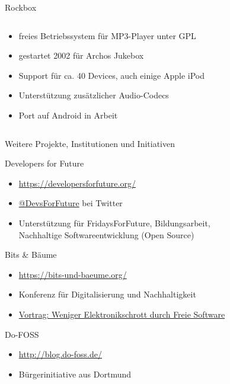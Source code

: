 \documentclass[t]{beamer}
\begin{document}
\begin{frame}{Rockbox}
    \begin{columns}[T]
        \begin{column}{0.45\textwidth}
            \begin{itemize}
                \item freies Betriebssystem für MP3-Player unter GPL
                \item gestartet 2002 für Archos Jukebox
                \item Support für ca. 40 Devices, auch einige Apple iPod
                \item Unterstützung zusätzlicher Audio-Codecs
                \item Port auf Android in Arbeit
            \end{itemize}
        \end{column}
        \begin{column}{0.5\textwidth}
        \end{column}
    \end{columns}
\end{frame}

\begin{frame}{Weitere Projekte, Institutionen und Initiativen}
    \begin{block}{Developers for Future}
        \begin{itemize}
            \item \url{https://developersforfuture.org/}
            \item
                \href{https://twitter.com/DevsForFuture}{@DevsForFuture}
                bei Twitter
            \item Unterstützung für FridaysForFuture, Bildungsarbeit, \\
                Nachhaltige Softwareentwicklung (Open Source)
        \end{itemize}
    \end{block}
    \begin{block}{Bits \& Bäume}
        \begin{itemize}
            \item \url{https://bits-und-baeume.org/}
            \item Konferenz für Digitalisierung und Nachhaltigkeit
            \item \href{https://fahrplan.bits-und-baeume.org/events/205.html}{Vortrag: Weniger Elektronikschrott durch Freie Software}
        \end{itemize}
    \end{block}
    \begin{block}{Do-FOSS}
        \begin{itemize}
            \item \url{http://blog.do-foss.de/}
            \item Bürgerinitiative aus Dortmund
        \end{itemize}
    \end{block}
\end{frame}
\end{document}
